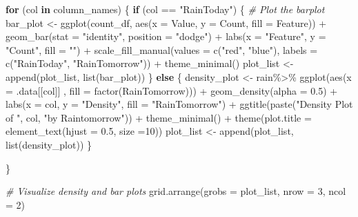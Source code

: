 \documentclass[
]{article}
\newenvironment{Shaded}{\begin{snugshade}}{\end{snugshade}}
\newcommand{\AttributeTok}[1]{\textcolor[rgb]{0.77,0.63,0.00}{#1}}
\newcommand{\CommentTok}[1]{\textcolor[rgb]{0.56,0.35,0.01}{\textit{#1}}}
\newcommand{\ControlFlowTok}[1]{\textcolor[rgb]{0.13,0.29,0.53}{\textbf{#1}}}
\newcommand{\DecValTok}[1]{\textcolor[rgb]{0.00,0.00,0.81}{#1}}
\newcommand{\FloatTok}[1]{\textcolor[rgb]{0.00,0.00,0.81}{#1}}
\newcommand{\FunctionTok}[1]{\textcolor[rgb]{0.00,0.00,0.00}{#1}}
\newcommand{\NormalTok}[1]{#1}
\newcommand{\OtherTok}[1]{\textcolor[rgb]{0.56,0.35,0.01}{#1}}
\newcommand{\SpecialCharTok}[1]{\textcolor[rgb]{0.00,0.00,0.00}{#1}}
\newcommand{\StringTok}[1]{\textcolor[rgb]{0.31,0.60,0.02}{#1}}
\begin{document}
\begin{Shaded}
\begin{Highlighting}[]
\ControlFlowTok{for}\NormalTok{ (col }\ControlFlowTok{in}\NormalTok{ column\_names) \{}
  \ControlFlowTok{if}\NormalTok{ (col }\SpecialCharTok{==} \StringTok{"RainToday"}\NormalTok{) \{}
    \CommentTok{\# Plot the barplot}
\NormalTok{    bar\_plot }\OtherTok{\textless{}{-}} \FunctionTok{ggplot}\NormalTok{(count\_df, }\FunctionTok{aes}\NormalTok{(}\AttributeTok{x =}\NormalTok{ Value, }\AttributeTok{y =}\NormalTok{ Count, }\AttributeTok{fill =}\NormalTok{ Feature)) }\SpecialCharTok{+}
    \FunctionTok{geom\_bar}\NormalTok{(}\AttributeTok{stat =} \StringTok{"identity"}\NormalTok{, }\AttributeTok{position =} \StringTok{"dodge"}\NormalTok{) }\SpecialCharTok{+}
    \FunctionTok{labs}\NormalTok{(}\AttributeTok{x =} \StringTok{"Feature"}\NormalTok{, }\AttributeTok{y =} \StringTok{"Count"}\NormalTok{, }\AttributeTok{fill =} \StringTok{""}\NormalTok{) }\SpecialCharTok{+}
    \FunctionTok{scale\_fill\_manual}\NormalTok{(}\AttributeTok{values =} \FunctionTok{c}\NormalTok{(}\StringTok{"red"}\NormalTok{, }\StringTok{"blue"}\NormalTok{), }\AttributeTok{labels =} \FunctionTok{c}\NormalTok{(}\StringTok{"RainToday"}\NormalTok{, }
                                                            \StringTok{"RainTomorrow"}\NormalTok{)) }\SpecialCharTok{+}
    \FunctionTok{theme\_minimal}\NormalTok{()}
\NormalTok{    plot\_list }\OtherTok{\textless{}{-}} \FunctionTok{append}\NormalTok{(plot\_list, }\FunctionTok{list}\NormalTok{(bar\_plot))}
\NormalTok{  \}}
  \ControlFlowTok{else}\NormalTok{ \{}
\NormalTok{    density\_plot }\OtherTok{\textless{}{-}}\NormalTok{ rain}\SpecialCharTok{\%\textgreater{}\%} \FunctionTok{ggplot}\NormalTok{(}\FunctionTok{aes}\NormalTok{(}\AttributeTok{x =}\NormalTok{ .data[[col]] , }
                                       \AttributeTok{fill =} \FunctionTok{factor}\NormalTok{(RainTomorrow))) }\SpecialCharTok{+}
    \FunctionTok{geom\_density}\NormalTok{(}\AttributeTok{alpha =} \FloatTok{0.5}\NormalTok{) }\SpecialCharTok{+}
    \FunctionTok{labs}\NormalTok{(}\AttributeTok{x =}\NormalTok{ col, }\AttributeTok{y =} \StringTok{"Density"}\NormalTok{, }\AttributeTok{fill =} \StringTok{"RainTomorrow"}\NormalTok{) }\SpecialCharTok{+}
    \FunctionTok{ggtitle}\NormalTok{(}\FunctionTok{paste}\NormalTok{(}\StringTok{"Density Plot of "}\NormalTok{, col, }\StringTok{"by Raintomorrow"}\NormalTok{)) }\SpecialCharTok{+}
    \FunctionTok{theme\_minimal}\NormalTok{() }\SpecialCharTok{+}
    \FunctionTok{theme}\NormalTok{(}\AttributeTok{plot.title =} \FunctionTok{element\_text}\NormalTok{(}\AttributeTok{hjust =} \FloatTok{0.5}\NormalTok{, }\AttributeTok{size =}\DecValTok{10}\NormalTok{))}
\NormalTok{  plot\_list }\OtherTok{\textless{}{-}} \FunctionTok{append}\NormalTok{(plot\_list, }\FunctionTok{list}\NormalTok{(density\_plot))}
\NormalTok{  \}}
  
\NormalTok{\}}

\CommentTok{\# Visualize density and bar plots}
\FunctionTok{grid.arrange}\NormalTok{(}\AttributeTok{grobs =}\NormalTok{ plot\_list, }\AttributeTok{nrow =} \DecValTok{3}\NormalTok{, }\AttributeTok{ncol =} \DecValTok{2}\NormalTok{)}
\end{Highlighting}
\end{Shaded}
\end{document}
